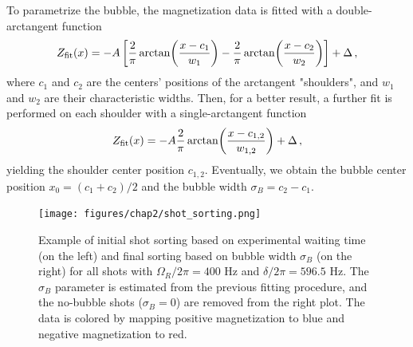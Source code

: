 To parametrize the bubble, the magnetization data is fitted with a double-arctangent function
\begin{equation}
    Z_{\rm fit}(x) = -A \left[\frac{2}{\pi}\arctan(\frac{x-c_1}{w_1}) - \frac{2}{\pi}\arctan(\frac{x-c_2}{w_2})\right] + \Delta\, ,
    \label{eq:double-atan}
\end{equation}
where $c_1$ and $c_2$ are the centers' positions of the arctangent "shoulders", and $w_1$ and $w_2$ are their characteristic widths. 
Then, for a better result, a further fit is performed on each shoulder with a single-arctangent function
\begin{equation}
    Z_{\rm fit}(x) = -A \frac{2}{\pi}\arctan(\frac{x-c_{1,2}}{w_{1,2}}) + \Delta\, ,
    \label{eq:atan}
\end{equation}
yielding the shoulder center position $c_{1,2}$. Eventually, we obtain the bubble center position $x_0 = (c_1 + c_2)/2$ and the bubble width $\sigma_B = c_2 - c_1$.

\begin{figure}[h!]
    \centering
    \texttt{[image: figures/chap2/shot\_sorting.png]}
    \caption{Example of initial shot sorting based on experimental waiting time (on the left) and final sorting based on bubble width $\sigma_B$ (on the right) for all shots with $\Omega_R/2\pi = 400$ \unit{\hertz} and $\delta/2\pi = 596.5$ \unit{\hertz}. The $\sigma_B$ parameter is estimated from the previous fitting procedure, and the no-bubble shots ($\sigma_B = 0$) are removed from the right plot. The data is colored by mapping positive magnetization to blue and negative magnetization to red.}
    \label{fig:sorting}
\end{figure}

